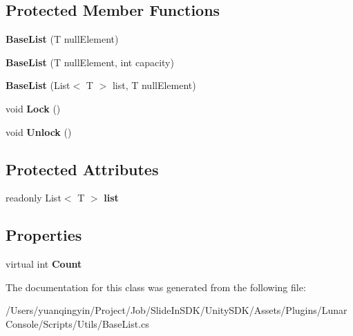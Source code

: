 \subsection*{Protected Member Functions}
\begin{DoxyCompactItemize}
\item 
\mbox{\label{class_lunar_console_plugin_internal_1_1_base_list_a24eb8c7b2fe0945681d84c7e9d40c499}} 
{\bfseries Base\+List} (T null\+Element)
\item 
\mbox{\label{class_lunar_console_plugin_internal_1_1_base_list_a6f3c648e0e105555c1c76d6885082ad8}} 
{\bfseries Base\+List} (T null\+Element, int capacity)
\item 
\mbox{\label{class_lunar_console_plugin_internal_1_1_base_list_a5595e7a54b465e64b48b08a7b7b68355}} 
{\bfseries Base\+List} (List$<$ T $>$ list, T null\+Element)
\item 
\mbox{\label{class_lunar_console_plugin_internal_1_1_base_list_ac7917f965a5407cef425efce828be14e}} 
void {\bfseries Lock} ()
\item 
\mbox{\label{class_lunar_console_plugin_internal_1_1_base_list_a810eddb408150ce0864f5d11f7f48d85}} 
void {\bfseries Unlock} ()
\end{DoxyCompactItemize}
\subsection*{Protected Attributes}
\begin{DoxyCompactItemize}
\item 
\mbox{\label{class_lunar_console_plugin_internal_1_1_base_list_ad9cff43b3af53fcb2798784a26d0c2aa}} 
readonly List$<$ T $>$ {\bfseries list}
\end{DoxyCompactItemize}
\subsection*{Properties}
\begin{DoxyCompactItemize}
\item 
\mbox{\label{class_lunar_console_plugin_internal_1_1_base_list_afe08c259a3ae92b795e3829e0e9272e5}} 
virtual int {\bfseries Count}
\end{DoxyCompactItemize}


The documentation for this class was generated from the following file\+:\begin{DoxyCompactItemize}
\item 
/\+Users/yuanqingyin/\+Project/\+Job/\+Slide\+In\+S\+D\+K/\+Unity\+S\+D\+K/\+Assets/\+Plugins/\+Lunar\+Console/\+Scripts/\+Utils/Base\+List.\+cs\end{DoxyCompactItemize}
